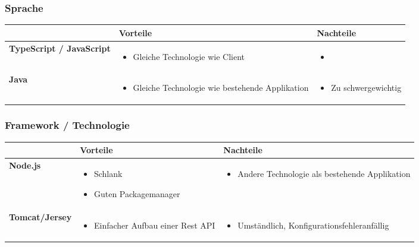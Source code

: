 		\subsubsection{Sprache}
			\begin{tabularx}{\textwidth}{|lXX|}
				\hline
					\textbf{} & \textbf{Vorteile} & \textbf{Nachteile}\\
				\hline
					\textbf{TypeScript / JavaScript} &
					\begin{itemize}
						\item Gleiche Technologie wie Client
					\end{itemize} &
					\begin{itemize}
						\item
					\end{itemize} \\
				\hline
				\textbf{Java} &
					\begin{itemize}
						\item Gleiche Technologie wie bestehende Applikation
					\end{itemize} &
					\begin{itemize}
						\item Zu schwergewichtig
					\end{itemize} \\
				\hline
			\end{tabularx}
				

				
		\subsubsection{Framework / Technologie}		
		
			\begin{tabularx}{\textwidth}{|lXX|}
				\hline
					\textbf{} & \textbf{Vorteile} & \textbf{Nachteile}\\
				\hline
					\textbf{Node.js} &
					\begin{itemize}
						\item Schlank
						\item Guten Packagemanager
					\end{itemize} &
					\begin{itemize}
						\item Andere Technologie als bestehende Applikation
					\end{itemize} \\
				\hline
					\textbf{Tomcat/Jersey} &
					\begin{itemize}
						\item Einfacher Aufbau einer Rest API
					\end{itemize} &
					\begin{itemize}
						\item Umständlich, Konfigurationsfehleranfällig
					\end{itemize} \\
				\hline
			\end{tabularx}




